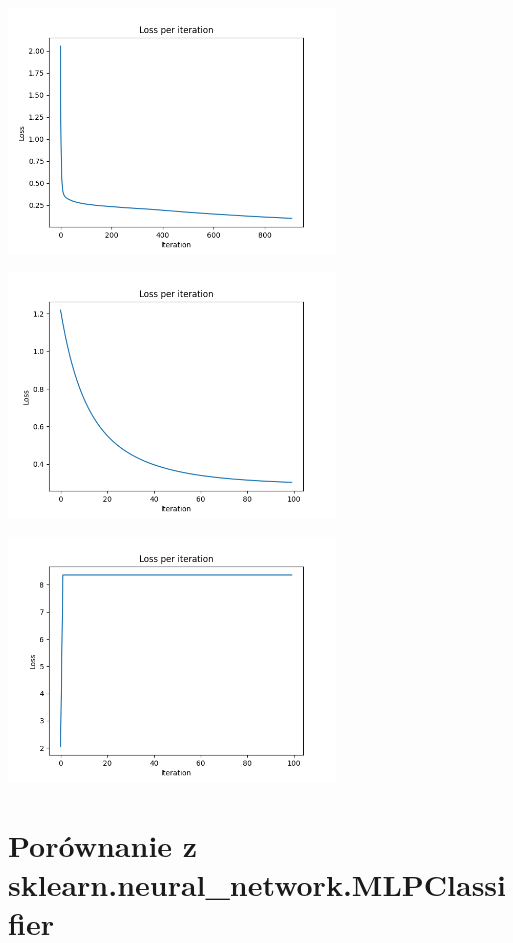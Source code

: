 \documentclass[12pt]{article}
\begin{document}
       \begin{center}
            \includegraphics[width=0.65\textwidth]{best-train.png}
        \end{center}
              \begin{center}
            \includegraphics[width=0.65\textwidth]{best-test.png}
        \end{center}
              \begin{center}
            \includegraphics[width=0.65\textwidth]{worst-train-test.png}
        \end{center}

\section{Porównanie z sklearn.neural\_network.MLPClassifier}
\end{document}
